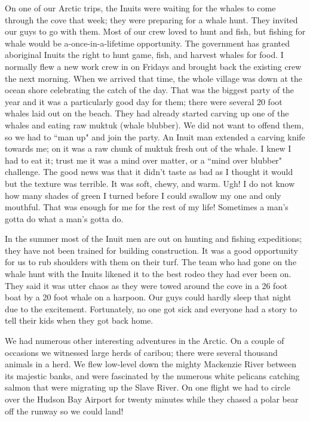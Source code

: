 \documentclass[oneside,12pt]{book}
\begin{document}
On one of our Arctic trips, the Inuits were waiting for the whales to come through the cove that week; they were preparing for a whale hunt. They invited our guys to go with them. Most of our crew loved to hunt and fish, but fishing for whale would be a-once-in-a-lifetime opportunity. The government has granted aboriginal Inuits the right to hunt game, fish, and harvest whales for food. I normally flew a new work crew in on Fridays and brought back the existing crew the next morning. When we arrived that time, the whole village was down at the ocean shore celebrating the catch of the day. That was the biggest party of the year and it was a particularly good day for them; there were several 20 foot whales laid out on the beach. They had already started carving up one of the whales and eating raw muktuk (whale blubber). We did not want to offend them, so we had to ``man up" and join the party. An Inuit man extended a carving knife towards me; on it was a raw chunk of muktuk fresh out of the whale. I knew I had to eat it; trust me it was a mind over matter, or a ``mind over blubber" challenge. The good news was that it didn't taste as bad as I thought it would but the texture was terrible. It was soft, chewy, and warm. Ugh! I do not know how many shades of green I turned before I could swallow my one and only mouthful. That was enough for me for the rest of my life! Sometimes a man's gotta do what a man's gotta do. 

In the summer most of the Inuit men are out on hunting and fishing expeditions; they have not been trained for building construction. It was a good opportunity for us to rub shoulders with them on their turf. The team who had gone on the whale hunt with the Inuits likened it to the best rodeo they had ever been on. They said it was utter chaos as they were towed around the cove in a 26 foot boat by a 20 foot whale on a harpoon. Our guys could hardly sleep that night due to the excitement. Fortunately, no one got sick and everyone had a story to tell their kids when they got back home.

We had numerous other interesting adventures in the Arctic. On a couple of occasions we witnessed large herds of caribou; there were several thousand animals in a herd. We flew low-level down the mighty Mackenzie River between its majestic banks, and were fascinated by the numerous white pelicans catching salmon that were migrating up the Slave River. On one flight we had to circle over the Hudson Bay Airport for twenty minutes while they chased a polar bear off the runway so we could land! 
\end{document}
